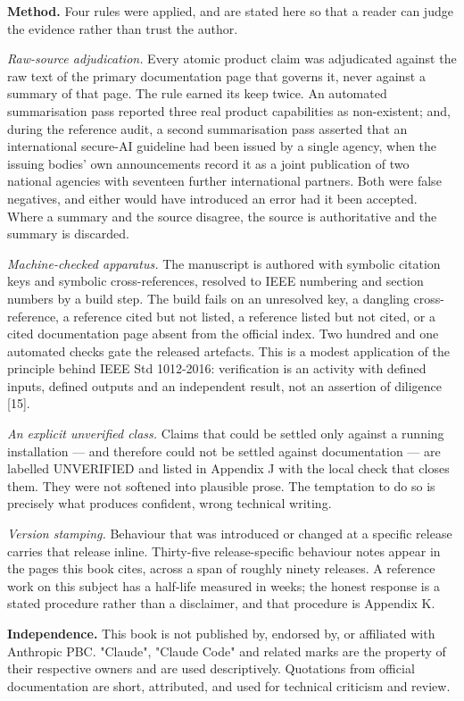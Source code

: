 \documentclass[11pt,a4paper,twoside,openany]{book}
\begin{document}
\textbf{Method.} Four rules were applied, and are stated here so that a reader can judge the evidence rather than trust the author.


\emph{Raw-source adjudication.} Every atomic product claim was adjudicated against the raw text of the primary documentation page that governs it, never against a summary of that page. The rule earned its keep twice. An automated summarisation pass reported three real product capabilities as non-existent; and, during the reference audit, a second summarisation pass asserted that an international secure-AI guideline had been issued by a single agency, when the issuing bodies' own announcements record it as a joint publication of two national agencies with seventeen further international partners. Both were false negatives, and either would have introduced an error had it been accepted. Where a summary and the source disagree, the source is authoritative and the summary is discarded.


\emph{Machine-checked apparatus.} The manuscript is authored with symbolic citation keys and symbolic cross-references, resolved to IEEE numbering and section numbers by a build step. The build fails on an unresolved key, a dangling cross-reference, a reference cited but not listed, a reference listed but not cited, or a cited documentation page absent from the official index. Two hundred and one automated checks gate the released artefacts. This is a modest application of the principle behind IEEE Std 1012-2016: verification is an activity with defined inputs, defined outputs and an independent result, not an assertion of diligence [15].


\emph{An explicit unverified class.} Claims that could be settled only against a running installation — and therefore could not be settled against documentation — are labelled UNVERIFIED and listed in Appendix J with the local check that closes them. They were not softened into plausible prose. The temptation to do so is precisely what produces confident, wrong technical writing.


\emph{Version stamping.} Behaviour that was introduced or changed at a specific release carries that release inline. Thirty-five release-specific behaviour notes appear in the pages this book cites, across a span of roughly ninety releases. A reference work on this subject has a half-life measured in weeks; the honest response is a stated procedure rather than a disclaimer, and that procedure is Appendix K.


\textbf{Independence.} This book is not published by, endorsed by, or affiliated with Anthropic PBC. "Claude", "Claude Code" and related marks are the property of their respective owners and are used descriptively. Quotations from official documentation are short, attributed, and used for technical criticism and review.
\end{document}
